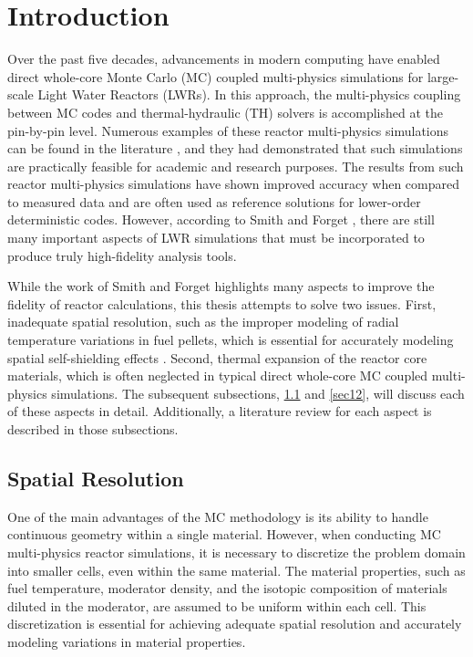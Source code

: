 \section{Introduction} \label{s1}

Over the past five decades, advancements in modern computing have enabled direct whole-core Monte Carlo (MC) coupled multi-physics simulations for large-scale Light Water Reactors (LWRs). In this approach, the multi-physics coupling between MC codes and thermal-hydraulic (TH) solvers is accomplished at the pin-by-pin level. Numerous examples of these reactor multi-physics simulations can be found in the literature \cite{tung_2020,kelly_2017,ma_2019}, and they had demonstrated that such simulations are practically feasible for academic and research purposes. The results from such reactor multi-physics simulations have shown improved accuracy when compared to measured data and are often used as reference solutions for lower-order deterministic codes. However, according to Smith and Forget \cite{smith_2013}, there are still many important aspects of LWR simulations that must be incorporated to produce truly high-fidelity analysis tools.

While the work of Smith and Forget highlights many aspects to improve the fidelity of reactor calculations, this thesis attempts to solve two issues. First, inadequate spatial resolution, such as the improper modeling of radial temperature variations in fuel pellets, which is essential for accurately modeling spatial self-shielding effects \cite{smith_2013, nchoi_2020}. Second, thermal expansion of the reactor core materials, which is often neglected in typical direct whole-core MC coupled multi-physics simulations. The subsequent subsections, \ref{sec11} and \ref{sec12}, will discuss each of these aspects in detail. Additionally, a literature review for each aspect is described in those subsections.

\subsection{Spatial Resolution} \label{sec11}

One of the main advantages of the MC methodology is its ability to handle continuous geometry within a single material. However, when conducting MC multi-physics reactor simulations, it is necessary to discretize the problem domain into smaller cells, even within the same material. The material properties, such as fuel temperature, moderator density, and the isotopic composition of materials diluted in the moderator, are assumed to be uniform within each cell. This discretization is essential for achieving adequate spatial resolution and accurately modeling variations in material properties.

